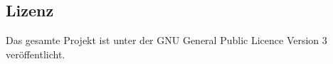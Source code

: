 \subsection{Lizenz}
Das gesamte Projekt ist unter der GNU General Public Licence Version 3 veröffentlicht.

